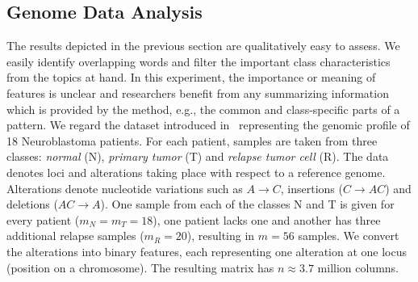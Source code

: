 \subsection{Genome Data Analysis}\label{sec:gene}
The results depicted in the previous section are qualitatively easy to assess. We easily identify overlapping words and filter the important class characteristics from the topics at hand. 
In this experiment, the importance or meaning of features is unclear and researchers benefit from any summarizing information which is provided by the method, e.g., the common and class-specific parts of a pattern.
We regard the dataset introduced in~\cite{schramm2015mutational} representing the genomic profile of 18 Neuroblastoma patients. For each patient, samples are taken from three classes: \emph{normal} (N), \emph{primary tumor} (T) and \emph{relapse tumor  cell} (R). The data denotes loci and alterations taking place with respect to a reference genome. Alterations denote nucleotide variations such as $A\rightarrow C$, insertions ($C\rightarrow AC$) and deletions ($AC\rightarrow A$). One sample from each of the classes N and T is given for every patient ($m_N=m_T=18$), one patient lacks one and another has three additional relapse samples ($m_R=20$), resulting in $m=56$ samples.   
We convert the alterations into binary features, each representing one alteration at one locus (position on a chromosome). The resulting matrix has $n\approx 3.7$ million columns.
